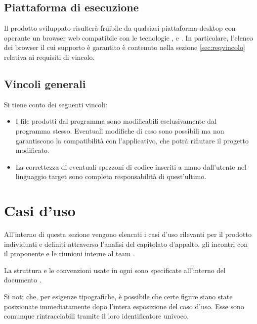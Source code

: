 \subsection{Piattaforma di esecuzione}
Il prodotto sviluppato risulterà fruibile da qualsiasi piattaforma desktop con operante un browser web compatibile con le tecnologie ,  e . In particolare, l'elenco dei browser il cui supporto è garantito è contenuto nella sezione \ref{sec:reqvincolo} relativa ai requisiti di vincolo.

\subsection{Vincoli generali}
Si tiene conto dei seguenti vincoli:
\begin{itemize}
	\item I file prodotti dal programma sono modificabili esclusivamente dal programma stesso. Eventuali modifiche di esso sono possibili ma non garantiscono la compatibilità con l'applicativo, che potrà rifiutare il progetto modificato.
	\item La correttezza di eventuali spezzoni di codice inseriti a mano dall'utente nel linguaggio target sono completa responsabilità di quest'ultimo.
\end{itemize}






\section{Casi d'uso}
All'interno di questa sezione vengono elencati i casi d'uso rilevanti per il prodotto \proj{} individuati e definiti attraverso l'analisi del capitolato d'appalto, gli incontri con il proponente e le riunioni interne al team \hx{}.

La struttura e le convenzioni usate in ogni  sono specificate all'interno del documento \NdP.

Si noti che, per esigenze tipografiche, è possibile che certe figure siano state posizionate immediatamente dopo l'intera esposizione del caso d'uso. Esse sono comunque rintracciabili tramite il loro identificatore univoco.

